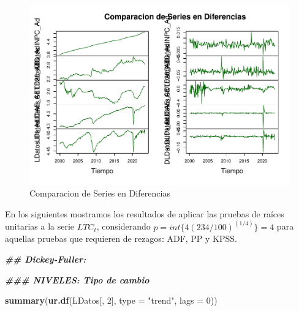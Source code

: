 \documentclass[
]{book}
\newenvironment{Shaded}{\begin{snugshade}}{\end{snugshade}}
\newcommand{\AttributeTok}[1]{\textcolor[rgb]{0.13,0.29,0.53}{#1}}
\newcommand{\DecValTok}[1]{\textcolor[rgb]{0.00,0.00,0.81}{#1}}
\newcommand{\DocumentationTok}[1]{\textcolor[rgb]{0.56,0.35,0.01}{\textbf{\textit{#1}}}}
\newcommand{\FunctionTok}[1]{\textcolor[rgb]{0.13,0.29,0.53}{\textbf{#1}}}
\newcommand{\NormalTok}[1]{#1}
\newcommand{\StringTok}[1]{\textcolor[rgb]{0.31,0.60,0.02}{#1}}
\begin{document}
\begin{figure}

{\centering \includegraphics{Notas-Series-Tiempo_files/figure-latex/fig75-1} 

}

\caption{Comparacion de Series en Diferencias}\label{fig:fig75}
\end{figure}

En los siguientes mostramos los resultados de aplicar las pruebas de raíces unitarias a la serie \(LTC_t\), considerando \(p = int \{ 4 (234/100)^{(1/4)} \} = 4\) para aquellas pruebas que requieren de rezagos: ADF, PP y KPSS.

\begin{Shaded}
\begin{Highlighting}[]
\DocumentationTok{\#\# Dickey{-}Fuller:}

\DocumentationTok{\#\#\# NIVELES: Tipo de cambio}

\FunctionTok{summary}\NormalTok{(}\FunctionTok{ur.df}\NormalTok{(LDatos[, }\DecValTok{2}\NormalTok{], }\AttributeTok{type =} \StringTok{"trend"}\NormalTok{, }\AttributeTok{lags =} \DecValTok{0}\NormalTok{))}
\end{Highlighting}
\end{Shaded}
\end{document}
